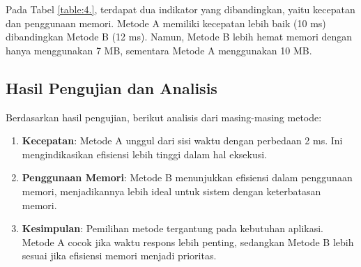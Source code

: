 Pada Tabel \ref{table:4.}, terdapat dua indikator yang dibandingkan, yaitu kecepatan dan penggunaan memori. Metode A memiliki kecepatan lebih baik (10 ms) dibandingkan Metode B (12 ms). Namun, Metode B lebih hemat memori dengan hanya menggunakan 7 MB, sementara Metode A menggunakan 10 MB.

\subsection{Hasil Pengujian dan Analisis}

Berdasarkan hasil pengujian, berikut analisis dari masing-masing metode:

\begin{enumerate}
    \item \textbf{Kecepatan}: Metode A unggul dari sisi waktu dengan perbedaan 2 ms. Ini mengindikasikan efisiensi lebih tinggi dalam hal eksekusi.
    \item \textbf{Penggunaan Memori}: Metode B menunjukkan efisiensi dalam penggunaan memori, menjadikannya lebih ideal untuk sistem dengan keterbatasan memori.
    \item \textbf{Kesimpulan}: Pemilihan metode tergantung pada kebutuhan aplikasi. Metode A cocok jika waktu respons lebih penting, sedangkan Metode B lebih sesuai jika efisiensi memori menjadi prioritas.
\end{enumerate}
